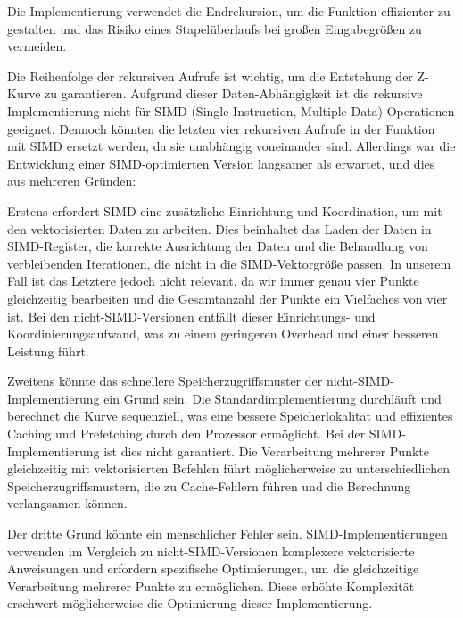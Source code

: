 \documentclass[course=erap]{aspdoc}
\begin{document}
\noindent Die Implementierung verwendet die Endrekursion, um die Funktion effizienter zu gestalten und das Risiko eines Stapelüberlaufs bei großen Eingabegrößen zu vermeiden.
\setlength{\parskip}{1em}

\noindent Die Reihenfolge der rekursiven Aufrufe ist wichtig, um die Entstehung der Z-Kurve zu garantieren. Aufgrund dieser Daten-Abhängigkeit ist die rekursive Implementierung nicht für SIMD (Single Instruction, Multiple Data)-Operationen geeignet. Dennoch könnten die letzten vier rekursiven Aufrufe in der Funktion mit SIMD ersetzt werden, da sie unabhängig voneinander sind. Allerdings war die Entwicklung einer SIMD-optimierten Version langsamer als erwartet, und dies aus mehreren Gründen:
\setlength{\parskip}{1em}

\noindent Erstens erfordert SIMD eine zusätzliche Einrichtung und Koordination, um mit den vektorisierten Daten zu arbeiten. Dies beinhaltet das Laden der Daten in SIMD-Register, die korrekte Ausrichtung der Daten und die Behandlung von verbleibenden Iterationen, die nicht in die SIMD-Vektorgröße passen. In unserem Fall ist das Letztere jedoch nicht relevant, da wir immer genau vier Punkte gleichzeitig bearbeiten und die Gesamtanzahl der Punkte ein Vielfaches von vier ist. Bei den nicht-SIMD-Versionen entfällt dieser Einrichtungs- und Koordinierungsaufwand, was zu einem geringeren Overhead und einer besseren Leistung führt.
\setlength{\parskip}{1em}

\noindent Zweitens könnte das schnellere Speicherzugriffsmuster der nicht-SIMD-Implementierung ein Grund sein. Die Standardimplementierung durchläuft und berechnet die Kurve sequenziell, was eine bessere Speicherlokalität und effizientes Caching und Prefetching durch den Prozessor ermöglicht. Bei der SIMD-Implementierung ist dies nicht garantiert. Die Verarbeitung mehrerer Punkte gleichzeitig mit vektorisierten Befehlen führt möglicherweise zu unterschiedlichen Speicherzugriffsmustern, die zu Cache-Fehlern führen und die Berechnung verlangsamen können.

\setlength{\parskip}{1em}

\noindent Der dritte Grund könnte ein menschlicher Fehler sein. SIMD-Implementierungen verwenden im Vergleich zu nicht-SIMD-Versionen komplexere vektorisierte Anweisungen und erfordern spezifische Optimierungen, um die gleichzeitige Verarbeitung mehrerer Punkte zu ermöglichen. Diese erhöhte Komplexität erschwert möglicherweise die Optimierung dieser Implementierung.
\setlength{\parskip}{1em}
\end{document}
